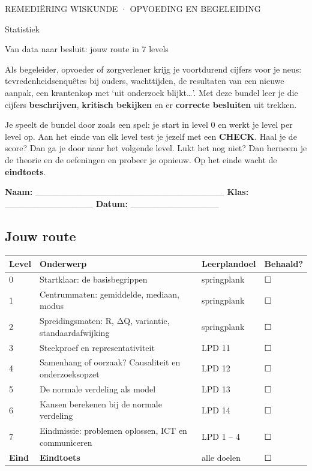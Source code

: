 \begin{banner}
REMEDIËRING WISKUNDE \quad· OPVOEDING EN BEGELEIDING
\end{banner}

\begin{titel}
Statistiek
\end{titel}

\begin{ondertitel}
Van data naar besluit: jouw route in 7 levels
\end{ondertitel}

Als begeleider, opvoeder of zorgverlener krijg je voortdurend cijfers voor je neus: tevredenheidsenquêtes bij ouders, wachttijden, de resultaten van een nieuwe aanpak, een krantenkop met ‘uit onderzoek blijkt…’. Met deze bundel leer je die cijfers \textbf{beschrijven}, \textbf{kritisch bekijken} en er \textbf{correcte besluiten} uit trekken.

Je speelt de bundel door zoals een spel: je start in level 0 en werkt je level per level op. Aan het einde van elk level test je jezelf met een \textbf{CHECK}. Haal je de score? Dan ga je door naar het volgende level. Lukt het nog niet? Dan herneem je de theorie en de oefeningen en probeer je opnieuw. Op het einde wacht de \textbf{eindtoets}.

\textbf{Naam:} \_\_\_\_\_\_\_\_\_\_\_\_\_\_\_\_\_\_\_\_\_\_\_\_\_\_\_\_\_\_ \quad \textbf{Klas:} \_\_\_\_\_\_\_\_\_\_\_\_\_\_ \quad \textbf{Datum:} \_\_\_\_\_\_\_\_\_\_\_\_\_\_

\subsection*{Jouw route}

\begin{tabular}{llll}
\hline
Level & Onderwerp & Leerplandoel & Behaald? \\
\hline
0 & Startklaar: de basisbegrippen & springplank & ☐ \\
1 & Centrummaten: gemiddelde, mediaan, modus & springplank & ☐ \\
2 & Spreidingsmaten: R, ΔQ, variantie, standaardafwijking & springplank & ☐ \\
3 & Steekproef en representativiteit & LPD 11 & ☐ \\
4 & Samenhang of oorzaak? Causaliteit en onderzoeksopzet & LPD 12 & ☐ \\
5 & De normale verdeling als model & LPD 13 & ☐ \\
6 & Kansen berekenen bij de normale verdeling & LPD 14 & ☐ \\
7 & Eindmissie: problemen oplossen, ICT en communiceren & LPD 1 – 4 & ☐ \\
\textbf{Eind} & \textbf{Eindtoets} & alle doelen & ☐ \\
\hline
\end{tabular}


